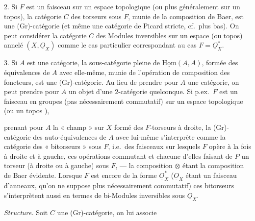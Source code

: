 \documentclass[11pt,a4paper]{article}
\begin{document}



2. Si $F$ est un faisceau sur un espace topologique (ou plus généralement
sur un topos), la catégorie $C$ des torseurs sous $F$, munie de la
composition de Baer, est une (Gr)-catégorie (et même une catégorie de
Picard stricte, cf.\ plus bas). On peut considérer la catégorie $C$ des
Modules inversibles sur un espace (ou topos)  annelé
\struck{\ill{}} $(X, \underline{O}_X)$ comme le cas particulier
correspondant au cas $F = \underline{O}_X^{*}$.

3. Si $A$ est une catégorie, la sous-catégorie pleine  de
$\underline{\mathrm{Hom}}(A,A)$, formée des équivalences de $A$ avec
elle-même, munie de l'opération de composition des foncteurs, est une
(Gr)-catégorie. Au lieu de prendre pour $A$ une catégorie, on peut  prendre pour $A$ un objet d'une 2-catégorie quelconque. Si
p.ex.\ $F$ est un faisceau en groupes (pas nécessairement commutatif) sur un
espace topologique (ou un topos ),

prenant pour $A$ la « champ » sur $X$ formé des $F$-torseurs à droite, la
(Gr)-catégorie des auto-équivalences de $A$ avec lui-même s'interprète comme
la catégorie des « bitorseurs » sous $F$, i.e.\ des faisceaux  sur
lesquels $F$ opère à la fois à droite et à gauche, ces opérations commutant
et chacune d'elles faisant de $P$ un torseur (à droite ou à gauche) sous
$F$, --- la composition $\otimes$ étant la composition de Baer évidente.
Lorsque $F$ est encore de la forme $\underline{O}_X^{*}$ ($\underline{O}_X$
étant un faisceau d'anneaux, qu'on ne suppose plus nécessairement
commutatif) ces bitorseurs s'interprètent aussi en termes de bi-Modules
 inversibles  sous $\underline{O}_X$.

\emph{Structure.} Soit $C$ une (Gr)-catégorie, on lui associe
\end{document}
